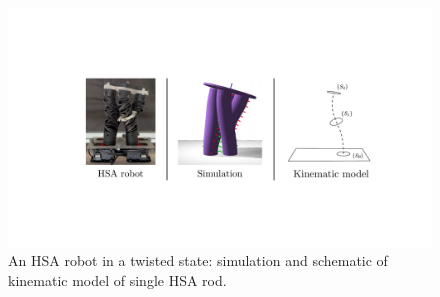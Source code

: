 \begin{figure}
    \centering
    \includegraphics[width=0.72\columnwidth]{hsamodel/figures/overview/overview_v2_cropped.pdf}
    \caption{An HSA robot in a twisted state: simulation and schematic of kinematic model of single HSA rod.}
    \label{fig:hsamodel:overview}
\end{figure}



